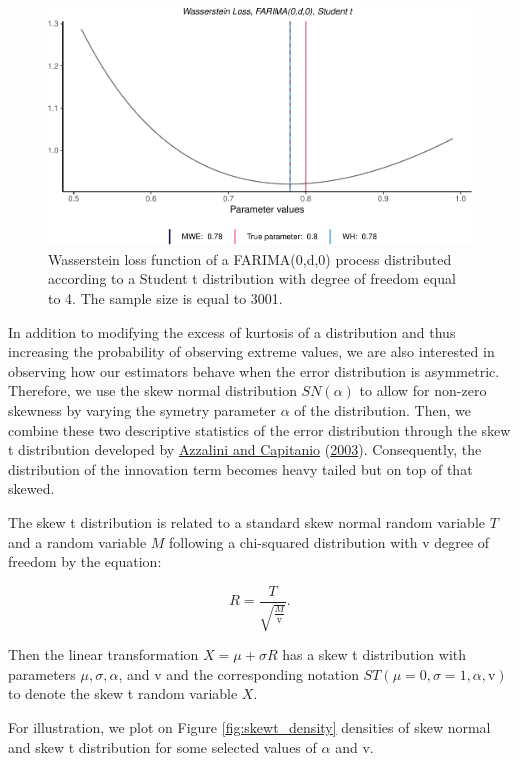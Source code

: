 \documentclass[
  11pt,
]{article}
\begin{document}
\begin{figure}

{\centering \includegraphics[width=0.5\linewidth]{Master_thesis_V5_files/figure-latex/Student_t-1} 

}

\caption{Wasserstein loss function of a FARIMA(0,d,0) process distributed according to a Student t distribution with degree of freedom equal to 4. The sample size is equal to 3001.}\label{fig:Student_t}
\end{figure}

In addition to modifying the excess of kurtosis of a distribution and
thus increasing the probability of observing extreme values, we are also
interested in observing how our estimators behave when the error
distribution is asymmetric. Therefore, we use the skew normal
distribution \(SN(\alpha)\) to allow for non-zero skewness by varying
the symetry parameter \(\alpha\) of the distribution. Then, we combine
these two descriptive statistics of the error distribution through the
skew t distribution developed by
\protect\hyperlink{ref-azzalini2003distributions}{Azzalini and
Capitanio} (\protect\hyperlink{ref-azzalini2003distributions}{2003}).
Consequently, the distribution of the innovation term becomes heavy
tailed but on top of that skewed.

The skew t distribution is related to a standard skew normal random
variable \(T\) and a random variable \(M\) following a chi-squared
distribution with \(\mathrm{v}\) degree of freedom by the equation:

\[R=\frac{T}{\sqrt{\frac{M}{\mathrm{v}}}}.\]

Then the linear transformation \(X=\mu+\sigma R\) has a skew t
distribution with parameters \(\mu, \sigma, \alpha\), and \(\mathrm{v}\)
and the corresponding notation
\(S T(\mu = 0, \sigma = 1, \alpha, \mathrm{v})\) to denote the skew t
random variable \(X\).

For illustration, we plot on Figure \ref{fig:skewt_density} densities of
skew normal and skew t distribution for some selected values of
\(\alpha\) and \(\mathrm{v}\).
\end{document}
